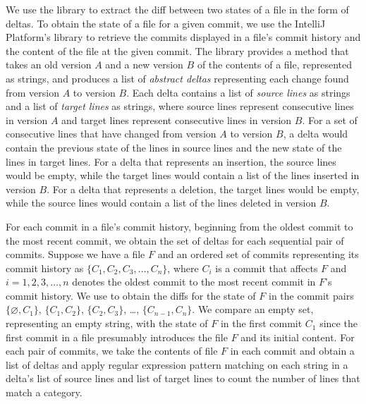 We use the  \cite{java-diff-utils} library to extract the diff between two states of a file in the form of deltas. 
To obtain the state of a file for a given commit, we use the IntelliJ Platform's  library to retrieve the commits displayed in a file's commit history and the content of the file at the given commit.
The  library provides a method that takes an old version $A$ and a new version $B$ of the contents of a file, represented as strings, and produces a list of \emph{abstract deltas} representing each change found from version $A$ to version $B$. 
Each delta contains a list of \emph{source lines} as strings and a list of \emph{target lines} as strings, where source lines represent consecutive lines in version $A$ and target lines represent consecutive lines in version $B$. 
For a set of consecutive lines that have changed from version $A$ to version $B$, a delta would contain the previous state of the lines in source lines and the new state of the lines in target lines.
For a delta that represents an insertion, the source lines would be empty, while the target lines would contain a list of the lines inserted in version $B$.
For a delta that represents a deletion, the target lines would be empty, while the source lines would contain a list of the lines deleted in version $B$.

For each commit in a file's commit history, beginning from the oldest commit to the most recent commit, we obtain the set of deltas for each sequential pair of commits.
Suppose we have a file $F$ and an ordered set of commits representing its commit history as $\{C_{1}, C_{2}, C_{3}, \dots, C_{n}\}$, where $C_{i}$ is a commit that affects $F$ and $i = 1, 2, 3, \dots, n$ denotes the oldest commit to the most recent commit in $F$'s commit history.
We use  to obtain the diffs for the state of $F$ in the commit pairs $\{\varnothing, C_{1}\}$, $\{C_{1}, C_{2}\}$, $\{C_{2}, C_{3}\}$, \dots, $\{C_{n-1}, C_{n}\}$.
We compare an empty set, representing an empty string, with the state of $F$ in the first commit $C_{1}$ since the first commit in a file presumably introduces the file $F$ and its initial content.
For each pair of commits, we take the contents of file $F$ in each commit and  obtain a list of deltas and apply regular expression pattern matching on each string in a delta's list of source lines and list of target lines to count the number of lines that match a category.

